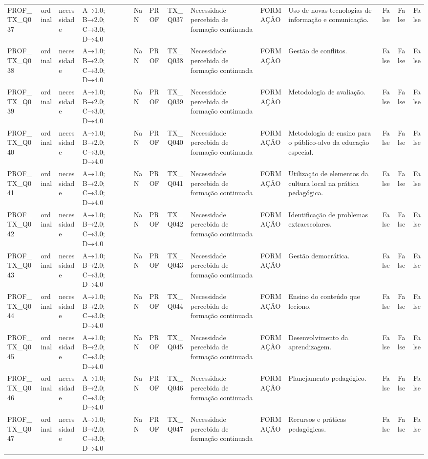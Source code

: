 \begin{tabular}{llllllllllrrr}
PROF\_TX\_Q037 & ordinal & necessidade & A→1.0; B→2.0; C→3.0; D→4.0 & NaN & PROF & TX\_Q037 & Necessidade percebida de formação continuada & FORMAÇÃO & Uso de novas tecnologias de informação e comunicação. & False & False & False \\
PROF\_TX\_Q038 & ordinal & necessidade & A→1.0; B→2.0; C→3.0; D→4.0 & NaN & PROF & TX\_Q038 & Necessidade percebida de formação continuada & FORMAÇÃO & Gestão de conflitos. & False & False & False \\
PROF\_TX\_Q039 & ordinal & necessidade & A→1.0; B→2.0; C→3.0; D→4.0 & NaN & PROF & TX\_Q039 & Necessidade percebida de formação continuada & FORMAÇÃO & Metodologia de avaliação. & False & False & False \\
PROF\_TX\_Q040 & ordinal & necessidade & A→1.0; B→2.0; C→3.0; D→4.0 & NaN & PROF & TX\_Q040 & Necessidade percebida de formação continuada & FORMAÇÃO & Metodologia de ensino para o público-alvo da educação especial. & False & False & False \\
PROF\_TX\_Q041 & ordinal & necessidade & A→1.0; B→2.0; C→3.0; D→4.0 & NaN & PROF & TX\_Q041 & Necessidade percebida de formação continuada & FORMAÇÃO & Utilização de elementos da cultura local na prática pedagógica. & False & False & False \\
PROF\_TX\_Q042 & ordinal & necessidade & A→1.0; B→2.0; C→3.0; D→4.0 & NaN & PROF & TX\_Q042 & Necessidade percebida de formação continuada & FORMAÇÃO & Identificação de problemas extraescolares. & False & False & False \\
PROF\_TX\_Q043 & ordinal & necessidade & A→1.0; B→2.0; C→3.0; D→4.0 & NaN & PROF & TX\_Q043 & Necessidade percebida de formação continuada & FORMAÇÃO & Gestão democrática. & False & False & False \\
PROF\_TX\_Q044 & ordinal & necessidade & A→1.0; B→2.0; C→3.0; D→4.0 & NaN & PROF & TX\_Q044 & Necessidade percebida de formação continuada & FORMAÇÃO & Ensino do conteúdo que leciono. & False & False & False \\
PROF\_TX\_Q045 & ordinal & necessidade & A→1.0; B→2.0; C→3.0; D→4.0 & NaN & PROF & TX\_Q045 & Necessidade percebida de formação continuada & FORMAÇÃO & Desenvolvimento da aprendizagem. & False & False & False \\
PROF\_TX\_Q046 & ordinal & necessidade & A→1.0; B→2.0; C→3.0; D→4.0 & NaN & PROF & TX\_Q046 & Necessidade percebida de formação continuada & FORMAÇÃO & Planejamento pedagógico. & False & False & False \\
PROF\_TX\_Q047 & ordinal & necessidade & A→1.0; B→2.0; C→3.0; D→4.0 & NaN & PROF & TX\_Q047 & Necessidade percebida de formação continuada & FORMAÇÃO & Recursos e práticas pedagógicas. & False & False & False \\

\end{tabular}
